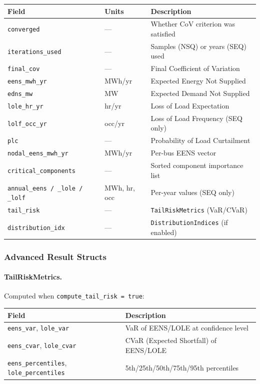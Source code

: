 \begin{center}
\begin{tabular}{lll}
\hline\hline
\textbf{Field} & \textbf{Units} & \textbf{Description} \\
\hline
\texttt{converged} & --- & Whether CoV criterion was satisfied \\
\texttt{iterations\_used} & --- & Samples (NSQ) or years (SEQ) used \\
\texttt{final\_cov} & --- & Final Coefficient of Variation \\
\texttt{eens\_mwh\_yr} & MWh/yr & Expected Energy Not Supplied \\
\texttt{edns\_mw} & MW & Expected Demand Not Supplied \\
\texttt{lole\_hr\_yr} & hr/yr & Loss of Load Expectation \\
\texttt{lolf\_occ\_yr} & occ/yr & Loss of Load Frequency (SEQ only) \\
\texttt{plc} & --- & Probability of Load Curtailment \\
\texttt{nodal\_eens\_mwh\_yr} & MWh/yr & Per-bus EENS vector \\
\texttt{critical\_components} & --- & Sorted component importance list \\
\texttt{annual\_eens / \_lole / \_lolf} & MWh, hr, occ & Per-year values (SEQ only) \\
\texttt{tail\_risk} & --- & \texttt{TailRiskMetrics} (VaR/CVaR) \\
\texttt{distribution\_idx} & --- & \texttt{DistributionIndices} (if enabled) \\
\hline\hline
\end{tabular}
\end{center}

\subsubsection{Advanced Result Structs}

\paragraph{TailRiskMetrics.}
Computed when \texttt{compute\_tail\_risk = true}:

\begin{center}
\begin{tabular}{ll}
\hline\hline
\textbf{Field} & \textbf{Description} \\
\hline
\texttt{eens\_var}, \texttt{lole\_var} & VaR of EENS/LOLE at confidence level \\
\texttt{eens\_cvar}, \texttt{lole\_cvar} & CVaR (Expected Shortfall) of EENS/LOLE \\
\texttt{eens\_percentiles}, \texttt{lole\_percentiles} & 5th/25th/50th/75th/95th percentiles \\
\hline\hline
\end{tabular}
\end{center}

